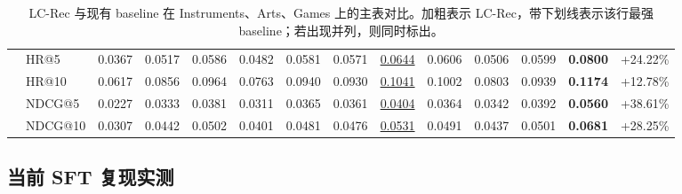 \documentclass[11pt,a4paper]{ctexart}
\begin{document}
\begin{table}[H]
{\begin{tabular}{llcccccccccccc}
 & HR@5 & 0.0367 & 0.0517 & 0.0586 & 0.0482 & 0.0581 & 0.0571 & \underline{0.0644} & 0.0606 & 0.0506 & 0.0599 & \textbf{0.0800} & +24.22\% \\
 & HR@10 & 0.0617 & 0.0856 & 0.0964 & 0.0763 & 0.0940 & 0.0930 & \underline{0.1041} & 0.1002 & 0.0803 & 0.0939 & \textbf{0.1174} & +12.78\% \\
 & NDCG@5 & 0.0227 & 0.0333 & 0.0381 & 0.0311 & 0.0365 & 0.0361 & \underline{0.0404} & 0.0364 & 0.0342 & 0.0392 & \textbf{0.0560} & +38.61\% \\
 & NDCG@10 & 0.0307 & 0.0442 & 0.0502 & 0.0401 & 0.0481 & 0.0476 & \underline{0.0531} & 0.0491 & 0.0437 & 0.0501 & \textbf{0.0681} & +28.25\% \\
\bottomrule
\end{tabular}%
}
\caption{LC-Rec 与现有 baseline 在 Instruments、Arts、Games 上的主表对比。加粗表示 LC-Rec，带下划线表示该行最强 baseline；若出现并列，则同时标出。}
\label{tab:lcrec-multidataset-main}
\end{table}

\subsection{当前 SFT 复现实测}

\begin{table}[H]
\centering
\small
\setlength{\tabcolsep}{4pt}
\renewcommand{\arraystretch}{1.08}
\caption{当前 LC-Rec/GenRec 相关 SFT 模型在 GenRec 统一评测口径下的复现实测。Arts 与 Games 取当前已同步 checkpoint 中的最佳结果。}
\label{tab:lcrec-genrec-sft-repro}
\end{table}
\end{document}
